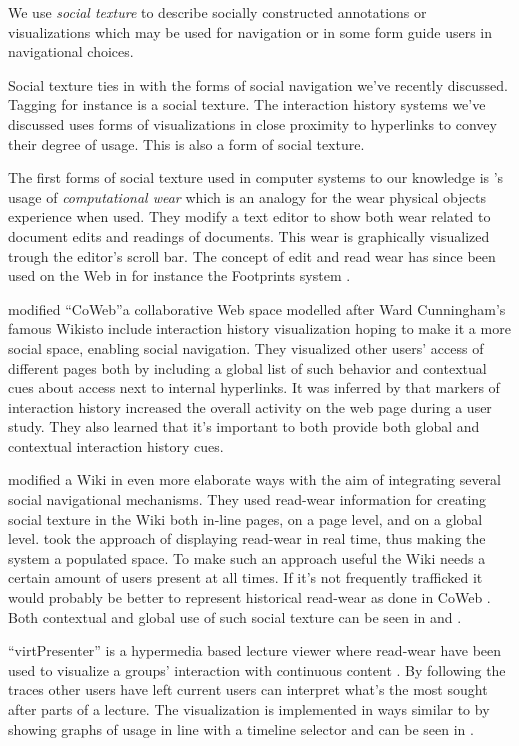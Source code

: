 We use \emph{social texture} to describe socially constructed annotations or
visualizations which may be used for navigation or in some form guide
users in navigational choices.

Social texture ties in with the forms of social navigation we've
recently discussed. Tagging for instance is a social texture.
The interaction history systems we've discussed uses forms of visualizations
in close proximity to hyperlinks to convey their degree of usage. This is also
a form of social texture.

The first forms of social texture used in computer systems to our knowledge is
\citet{hill92}'s usage of \emph{computational wear} which is an analogy for
the wear physical objects experience when used. They modify a text editor to
show both wear related to document edits and readings of documents. This wear
is graphically visualized trough the editor's scroll bar.
The concept of edit and read wear has since been used on the Web in for
instance the Footprints system \citep{wexelblat99}.

\citet{dieberger00a} modified ``CoWeb''\dash{}a collaborative Web space
modelled after Ward Cunningham's famous Wikis\dash{}to include interaction
history visualization hoping to make it a more social space, enabling social
navigation. They visualized other users' access of different pages both by
including a global list of such behavior and contextual cues about access
next to internal hyperlinks.
It was inferred by \citeauthor{dieberger00a} that markers of interaction
history increased the overall activity on the web page during a user study.
They also learned that it's important to both provide both global and
contextual interaction history cues.

\citet{xu06} modified a Wiki in even more elaborate ways
with the aim of integrating several social navigational mechanisms.
They used read-wear information for creating social
texture in the Wiki both in-line pages, on a page level, and on a global
level. \citeauthor{xu06} took the approach of displaying read-wear in real
time, thus making the system a populated space. To make such an approach
useful the Wiki needs a certain amount of users present at all times. If
it's not frequently trafficked it would probably be better to represent
historical read-wear as done in CoWeb \citep[p.~220]{dieberger00a}. Both
contextual and global use of such social texture can be seen in
 and .

``virtPresenter'' is a hypermedia based lecture viewer where read-wear have
been used to visualize a groups' interaction with continuous content
\citep{mertens06}. By following the traces other users have left current users
can interpret what's the most sought after parts of a lecture. The
visualization is implemented in ways similar to \citet{hill92} by showing
graphs of usage in line with a timeline selector and can be seen in
.

